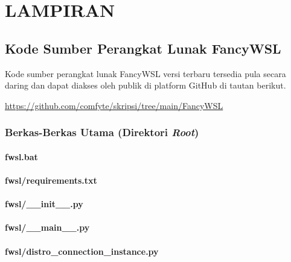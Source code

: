 \chapter*{LAMPIRAN}
\section{Kode Sumber Perangkat Lunak FancyWSL}

Kode sumber perangkat lunak FancyWSL versi terbaru tersedia pula secara daring dan dapat diakses oleh publik di platform GitHub di tautan berikut.

\href{https://github.com/comfyte/skripsi/tree/main/FancyWSL}{https://github.com/comfyte/skripsi/tree/main/FancyWSL}


\subsection{Berkas-Berkas Utama (Direktori \textit{Root})}

\subsubsection{fwsl.bat}


\subsubsection{fwsl/requirements.txt}


\subsubsection{fwsl/\_\_init\_\_.py}


\subsubsection{fwsl/\_\_main\_\_.py}


\subsubsection{fwsl/distro\_connection\_instance.py}


